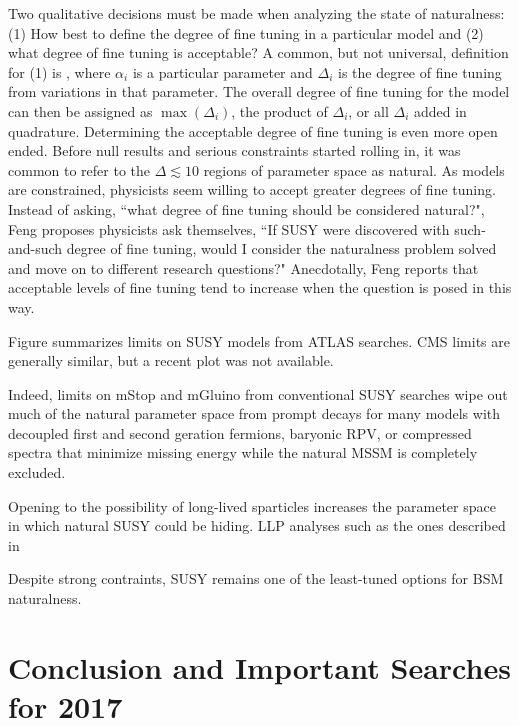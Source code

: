 \documentclass[12pt]{article}
\begin{document}
    Two qualitative decisions must be made when analyzing the state of naturalness: (1) How best to define the degree of fine tuning in a particular model and (2) what degree of fine tuning is acceptable? A common, but not universal, definition for (1) is , where $\alpha_i$ is a particular parameter and $\Delta_i$ is the degree of fine tuning from variations in that parameter. The overall degree of fine tuning for the model can then be assigned as $\max{\left(\Delta_i\right)}$, the product of $\Delta_i$, or all $\Delta_i$ added in quadrature. Determining the acceptable degree of fine tuning is even more open ended. Before null results and serious constraints started rolling in, it was common to refer to the $\Delta \lesssim 10$ regions of parameter space as natural. As models are constrained, physicists seem willing to accept greater degrees of fine tuning. Instead of asking, ``what degree of fine tuning should be considered natural?", Feng proposes physicists ask themselves, ``If SUSY were discovered with such-and-such degree of fine tuning, would I consider the naturalness problem solved and move on to different research questions?" Anecdotally, Feng reports that acceptable levels of fine tuning tend to increase when the question is posed in this way.  

    Figure  summarizes limits on SUSY models from ATLAS searches. CMS limits are generally similar, but a recent plot was not available.   

    Indeed, limits on mStop and mGluino from conventional SUSY searches wipe out much of the natural parameter space from prompt decays for many models with decoupled first and second geration fermions, baryonic RPV, or compressed spectra that minimize missing energy while the natural MSSM is completely excluded.  

    Opening to the possibility of long-lived sparticles increases the parameter space in which natural SUSY could be hiding. LLP analyses such as the ones described in    

    Despite strong contraints, SUSY remains one of the least-tuned options for BSM naturalness.    

\section{Conclusion and Important Searches for 2017}


\clearpage
\pagebreak
\singlespacing
{}

\end{document}
